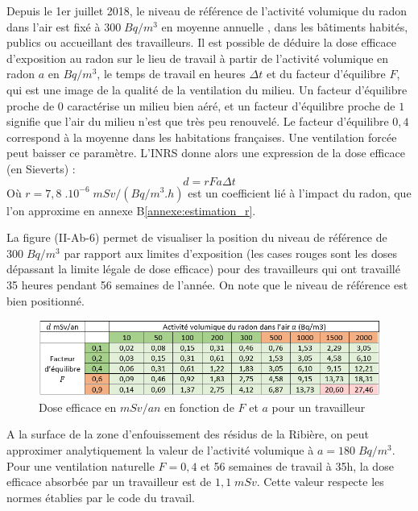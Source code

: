 \documentclass{article}
\begin{document}
Depuis le 1er juillet 2018, le niveau de référence de l’activité volumique du radon dans l'air est fixé à $300 \; Bq/m^3$ en moyenne annuelle \cite{autorite_de_surete_nucleaire_reglementation_nodate}, dans les bâtiments habités, publics ou accueillant des travailleurs. Il est possible de déduire la dose efficace d’exposition au radon sur le lieu de travail à partir de l’activité volumique en radon $a$ en $Bq/m^3$, le temps de travail en heures $\Delta t$ et du facteur d’équilibre $F$, qui est une image de la qualité de la ventilation du milieu. Un facteur d’équilibre proche de $0$ caractérise un milieu bien aéré, et un facteur d’équilibre proche de $1$ signifie que l’air du milieu n’est que très peu renouvelé. Le facteur d’équilibre $0,4$ correspond à la moyenne dans les habitations françaises. Une ventilation forcée peut baisser ce paramètre. L'INRS donne alors une expression \cite{blanchardon_evaluation_2019} de la dose efficace (en Sieverts) :
$$
d = r F a \Delta t
$$
Où $r=7,8 \; .10^{-6} \; mSv/(Bq/m^3.h)$ est un coefficient lié à l’impact du radon, que l'on approxime en annexe B\ref{annexe:estimation_r}.

La figure (II-Ab-6) permet de visualiser la position du niveau de référence de $300 \; Bq/m^3$ par rapport aux limites d’exposition (les cases rouges sont les doses dépassant la limite légale de dose efficace) pour des travailleurs qui ont travaillé 35 heures pendant 56 semaines de l’année. On note que le niveau de référence est bien positionné.

\begin{figure}[H]
    \centering
    \includegraphics[width=\linewidth]{II_A2_6.png}
    \caption{Dose efficace en $mSv/an$ en fonction de $F$ et $a$ pour un travailleur}
    \label{fig:exposition_double_entree}
\end{figure}

A la surface de la zone d’enfouissement des résidus de la Ribière, on peut approximer analytiquement la valeur de l’activité volumique à $a=180 \; Bq/m^3$. Pour une ventilation naturelle $F=0,4$ et 56 semaines de travail à 35h, la dose efficace absorbée par un travailleur est de $1,1 \; mSv$. Cette valeur respecte les normes établies par le code du travail.
\end{document}
